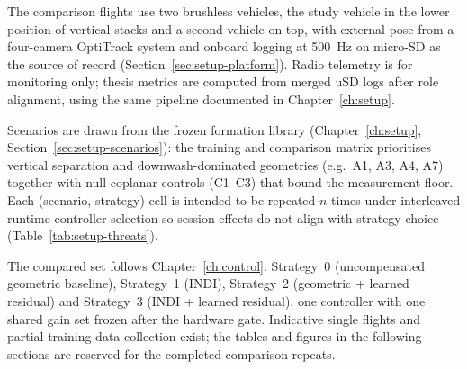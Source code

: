 The comparison flights use two brushless vehicles, the study vehicle in the lower position of
vertical stacks and a second vehicle on top, with external pose from a four-camera OptiTrack system and
onboard logging at \SI{500}{\hertz} on micro-SD as the source of record (Section~\ref{sec:setup-platform}).
Radio telemetry is for monitoring only; thesis metrics are computed from merged uSD logs after role
alignment, using the same pipeline documented in Chapter~\ref{ch:setup}.

Scenarios are drawn from the frozen formation library (Chapter~\ref{ch:setup}, Section~\ref{sec:setup-scenarios}):
the training and comparison matrix prioritises vertical separation and downwash-dominated geometries (e.g.\ A1,
A3, A4, A7) together with null coplanar controls (C1--C3) that bound the measurement floor. Each
(scenario, strategy) cell is intended to be repeated $n$ times under interleaved runtime controller
selection so session effects do not align with strategy choice (Table~\ref{tab:setup-threats}).

The compared set follows Chapter~\ref{ch:control}: Strategy~0 (uncompensated geometric baseline),
Strategy~1 (INDI), Strategy~2 (geometric + learned residual) and Strategy~3 (INDI + learned
residual), one controller with one shared gain set frozen after the hardware gate.
Indicative single flights and partial training-data collection
exist; the tables and figures in the following sections are reserved for the completed comparison repeats.


